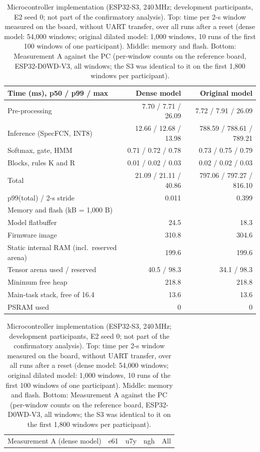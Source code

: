 \begin{table}[htbp]
\centering\footnotesize
\caption{Microcontroller implementation (ESP32-S3, 240\,MHz; development participants, E2 seed 0; not part of the confirmatory analysis). Top: time per 2-s window measured on the board, without UART transfer, over all runs after a reset (dense model: 54,000 windows; original dilated model: 1,000 windows, 10 runs of the first 100 windows of one participant). Middle: memory and flash. Bottom: Measurement A against the PC (per-window counts on the reference board, ESP32-D0WD-V3, all windows; the S3 was identical to it on the first 1,800 windows per participant). }\label{tab:mcu}
\begin{tabular}{lrr}
\toprule
Time (ms), p50 / p99 / max & Dense model & Original model \\
\midrule
Pre-processing & 7.70 / 7.71 / 26.09 & 7.72 / 7.91 / 26.09 \\
Inference (SpecFCN, INT8) & 12.66 / 12.68 / 13.98 & 788.59 / 788.61 / 789.21 \\
Softmax, gate, HMM & 0.71 / 0.72 / 0.78 & 0.73 / 0.75 / 0.79 \\
Blocks, rules K and R & 0.01 / 0.02 / 0.03 & 0.02 / 0.02 / 0.03 \\
Total & 21.09 / 21.11 / 40.86 & 797.06 / 797.27 / 816.10 \\
p99(total) / 2-s stride & 0.011 & 0.399 \\
\midrule
Memory and flash (kB = 1,000 B) & & \\
\midrule
Model flatbuffer & 24.5 & 18.3 \\
Firmware image & 310.8 & 304.6 \\
Static internal RAM (incl.\ reserved arena) & 199.6 & 199.6 \\
Tensor arena used / reserved & 40.5 / 98.3 & 34.1 / 98.3 \\
Minimum free heap & 218.8 & 218.8 \\
Main-task stack, free of 16.4 & 13.6 & 13.6 \\
PSRAM used & 0 & 0 \\
\bottomrule
\end{tabular}
\par\medskip
{\setlength{\tabcolsep}{4pt}\begin{tabular}{lrrrr}
\toprule
Measurement A (dense model) & e61 & u7y & ngh & All \\

\end{tabular}}
\end{table}
